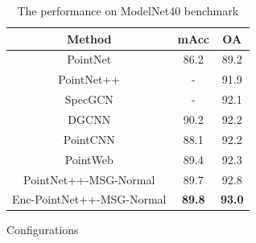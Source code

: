 \documentclass[runningheads]{llncs}
\begin{document}
\begin{table}[t]
    \centering
    \begin{tabular}{c|cc}
    \toprule
    Method & mAcc & OA \\
    \midrule
      PointNet& 86.2 & 89.2\\
      PointNet++& - &91.9\\    
      SpecGCN &-& 92.1\\
      DGCNN &90.2 &92.2\\
      PointCNN &88.1& 92.2\\
      PointWeb &89.4&92.3\\
      \midrule
      PointNet++-MSG-Normal& 89.7& 92.8 \\
      Enc-PointNet++-MSG-Normal& \textbf{89.8} & \textbf{93.0}\\
     \bottomrule
    \end{tabular}
    \caption{The performance  on ModelNet40 benchmark}
    \label{tab:ModelNet}
\end{table}




Configurations







\end{document}
